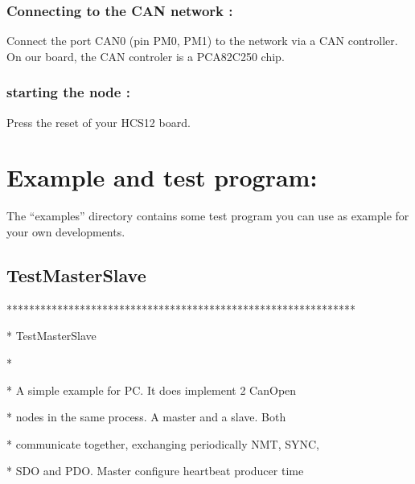 \documentclass[a4paper,12pt]{book}
\begin{document}
\subsubsection{Connecting to the CAN network :}
Connect the port CAN0 (pin PM0, PM1) to the network via a CAN
controller. On our board, the CAN controler is a PCA82C250 chip.

\subsubsection{starting the node :}
Press the reset of your HCS12 board.

\section{Example and test program:}
The ``examples'' directory contains some test program you can use as
example for your own developments.

\subsection{TestMasterSlave}
{\ttfamily
**************************************************************\space}

{\ttfamily
* \space TestMasterSlave
\space \space \space \space \space \space \space \space \space \space \space \space \space \space \space \space \space \space \space \space \space \space \space \space \space \space \space \space \space \space \space \space \space \space \space \space \space \space \space \space \space \space *}

{\ttfamily
*
\space \space \space \space \space \space \space \space \space \space \space \space \space \space \space \space \space \space \space \space \space \space \space \space \space \space \space \space \space \space \space \space \space \space \space \space \space \space \space \space \space \space \space \space \space \space \space \space \space \space \space \space \space \space \space \space \space \space \space *}

{\ttfamily
* \space A simple example for PC. It does implement 2 CanOpen \space \space \space \space \space *}

{\ttfamily
* \space nodes in the same process. A master and a slave. Both \space \space \space \space *}

{\ttfamily
* \space communicate together, exchanging periodically NMT, SYNC, \space *}

{\ttfamily
* \space SDO and PDO. Master configure heartbeat producer time \space \space \space \space *}
\end{document}

